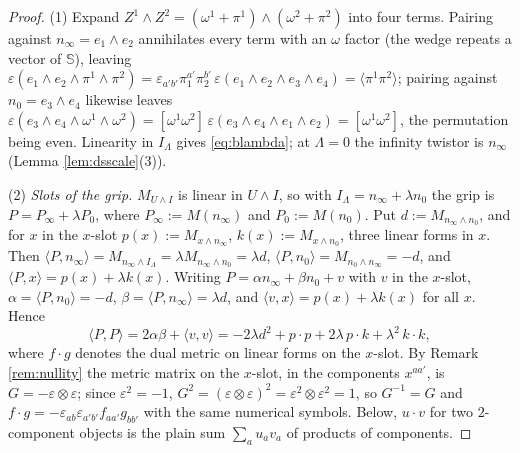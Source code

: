 \documentclass[11pt]{article}
\theoremstyle{definition}
\newcommand{\ip}[2]{\langle #1, #2\rangle}
\newcommand{\br}[1]{\langle #1\rangle}
\newcommand{\Sc}{\mathbb{S}}
\begin{document}
\begin{proof}
(1) Expand $Z^{1}\wedge Z^{2} = (\omega^{1} + \pi^{1})\wedge(\omega^{2} + \pi^{2})$ into four terms. Pairing against $n_{\infty} = e_{1}\wedge e_{2}$ annihilates every term with an $\omega$ factor (the wedge repeats a vector of $\Sc$), leaving $\varepsilon(e_{1}\wedge e_{2}\wedge\pi^{1}\wedge\pi^{2}) = \varepsilon_{a'b'}\pi_{1}^{a'}\pi_{2}^{b'}\,\varepsilon(e_{1}\wedge e_{2}\wedge e_{3}\wedge e_{4}) = \br{\pi^{1}\pi^{2}}$; pairing against $n_{0} = e_{3}\wedge e_{4}$ likewise leaves $\varepsilon(e_{3}\wedge e_{4}\wedge\omega^{1}\wedge\omega^{2}) = [\omega^{1}\omega^{2}]\,\varepsilon(e_{3}\wedge e_{4}\wedge e_{1}\wedge e_{2}) = [\omega^{1}\omega^{2}]$, the permutation being even. Linearity in $I_{\Lambda}$ gives \eqref{eq:blambda}; at $\Lambda = 0$ the infinity twistor is $n_{\infty}$ (Lemma \ref{lem:dsscale}(3)).

(2) \emph{Slots of the grip.} $M_{U\wedge I}$ is linear in $U \wedge I$, so with $I_{\Lambda} = n_{\infty} + \lambda n_{0}$ the grip is $P = P_{\infty} + \lambda P_{0}$, where $P_{\infty} := M(n_{\infty})$ and $P_{0} := M(n_{0})$. Put $d := M_{n_{\infty}\wedge n_{0}}$, and for $x$ in the $x$-slot $p(x) := M_{x\wedge n_{\infty}}$, $k(x) := M_{x\wedge n_{0}}$, three linear forms in $x$. Then $\ip{P}{n_{\infty}} = M_{n_{\infty}\wedge I_{\Lambda}} = \lambda M_{n_{\infty}\wedge n_{0}} = \lambda d$, $\ip{P}{n_{0}} = M_{n_{0}\wedge n_{\infty}} = -d$, and $\ip{P}{x} = p(x) + \lambda k(x)$. Writing $P = \alpha n_{\infty} + \beta n_{0} + v$ with $v$ in the $x$-slot, $\alpha = \ip{P}{n_{0}} = -d$, $\beta = \ip{P}{n_{\infty}} = \lambda d$, and $\ip{v}{x} = p(x) + \lambda k(x)$ for all $x$. Hence
\[
\ip{P}{P} = 2\alpha\beta + \ip{v}{v} = -2\lambda d^{2} + p\cdot p + 2\lambda\, p\cdot k + \lambda^{2}\, k\cdot k,
\]
where $f \cdot g$ denotes the dual metric on linear forms on the $x$-slot. By Remark \ref{rem:nullity} the metric matrix on the $x$-slot, in the components $x^{aa'}$, is $G = -\varepsilon\otimes\varepsilon$; since $\varepsilon^{2} = -1$, $G^{2} = (\varepsilon\otimes\varepsilon)^{2} = \varepsilon^{2}\otimes\varepsilon^{2} = 1$, so $G^{-1} = G$ and $f\cdot g = -\varepsilon_{ab}\varepsilon_{a'b'}f_{aa'}g_{bb'}$ with the same numerical symbols. Below, $u\cdot v$ for two $2$-component objects is the plain sum $\sum_{a}u_{a}v_{a}$ of products of components.


\end{proof}
\end{document}
